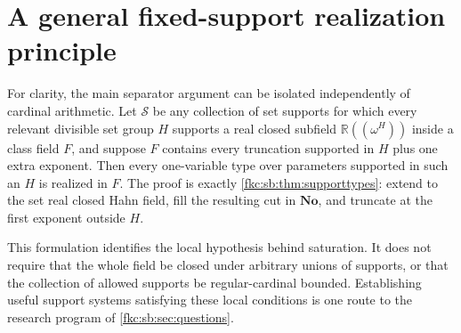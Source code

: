 \documentclass[11pt,letterpaper]{article}
\numberwithin{equation}{section}
\theoremstyle{definition}
\theoremstyle{remark}
\newcommand{\R}{\mathbb R}
\newcommand{\No}{\mathbf{No}}
\begin{document}
\section{A general fixed-support realization principle}\label{fkc:sb:app:realization}

For clarity, the main separator argument can be isolated independently of cardinal arithmetic. Let $\mathcal S$ be any collection of set supports for which every relevant divisible set group $H$ supports a real closed subfield $\R((\omega^H))$ inside a class field $F$, and suppose $F$ contains every truncation supported in $H$ plus one extra exponent. Then every one-variable type over parameters supported in such an $H$ is realized in $F$. The proof is exactly \cref{fkc:sb:thm:supporttypes}: extend to the set real closed Hahn field, fill the resulting cut in $\No$, and truncate at the first exponent outside $H$.

This formulation identifies the local hypothesis behind saturation. It does not require that the whole field be closed under arbitrary unions of supports, or that the collection of allowed supports be regular-cardinal bounded. Establishing useful support systems satisfying these local conditions is one route to the research program of \cref{fkc:sb:sec:questions}.
\end{document}
